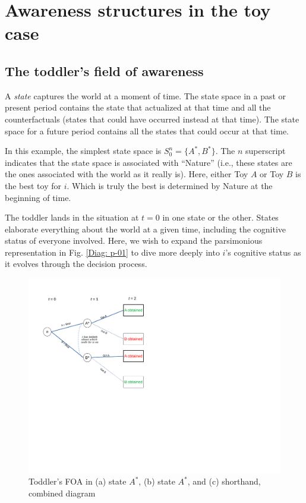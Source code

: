 \documentclass[
11pt,
titlepage,
reqno,
]{article}%
\theoremstyle{definition}
\begin{document}
\section{Awareness structures in the toy case}
\subsection{The toddler's field of awareness}
A \textit{state} captures the world at a moment of time. The state space in a past or present period contains the state that actualized at that time and all the counterfactuals (states that could have occurred instead at that time). The state space for a future period contains all the states that could occur at that time. 

In this example, the simplest state space is $S^n_0=\{A^\ast,B^\ast\}$. The $n$ superscript indicates that the state space is associated with ``Nature'' (i.e., these states are the ones associated with the world as it really is). Here, either Toy $A$ or Toy $B$ is the best toy for $i$. Which is truly the best is determined by Nature at the beginning of time. 

The toddler lands in the situation at $t=0$ in one state or the other. States elaborate everything about the world at a given time, including the cognitive status of everyone involved. Here, we wish to expand the parsimonious representation in Fig. \ref{Diag: p-01} to dive more deeply into $i$'s cognitive status as it evolves through the decision process. 

\begin{figure}[h!]
	\centering
	\includegraphics*[page=3,trim = 0in 4.5in 0in .5in,scale=.7]{Awareness_Diagrams_All}
	\caption{Toddler's FOA in (a) state $A^\ast$, (b) state $A^\ast$, and (c) shorthand, combined diagram\label{Diag: p-03}}%
\end{figure}
\end{document}
